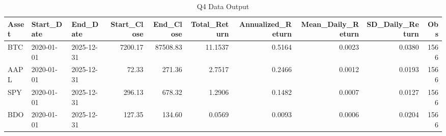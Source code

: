 \begin{table}[H]
\centering
\caption{Q4 Data Output}
\label{tab:q4}
\begin{tabular}{lllrrrrrrr}
\toprule
Asset & Start\_Date & End\_Date & Start\_Close & End\_Close & Total\_Return & Annualized\_Return & Mean\_Daily\_Return & SD\_Daily\_Return & Obs \\
\midrule
BTC & 2020-01-01 & 2025-12-31 & 7200.17 & 87508.83 & 11.1537 & 0.5164 & 0.0023 & 0.0380 & 1566 \\
AAPL & 2020-01-01 & 2025-12-31 & 72.33 & 271.36 & 2.7517 & 0.2466 & 0.0012 & 0.0193 & 1566 \\
SPY & 2020-01-01 & 2025-12-31 & 296.13 & 678.32 & 1.2906 & 0.1482 & 0.0007 & 0.0127 & 1566 \\
BDO & 2020-01-01 & 2025-12-31 & 127.35 & 134.60 & 0.0569 & 0.0093 & 0.0006 & 0.0204 & 1566 \\
\bottomrule
\end{tabular}
\end{table}
